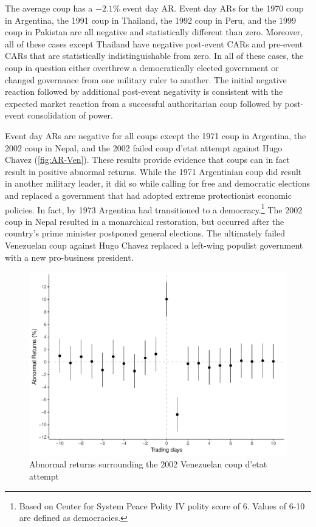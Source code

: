 \documentclass[12pt,final,fleqn]{article}
\theoremstyle{plain}
\begin{document}
The average coup has a $-2.1\%$ event day AR. Event day ARs for the 1970 coup in Argentina, the 1991 coup in Thailand, the 1992 coup in Peru, and the 1999 coup in Pakistan are all negative and statistically different than zero. Moreover, all of these cases except Thailand have negative post-event CARs and pre-event CARs that are statistically indistinguishable from zero. In all of these cases, the coup in question either overthrew a democratically elected government or changed governance from one military ruler to another. The initial negative reaction followed by additional post-event negativity is consistent with the expected market reaction from a successful authoritarian coup followed by post-event consolidation of power. 

Event day ARs are negative for all coups except the 1971 coup in Argentina, the 2002 coup in Nepal, and the 2002 failed coup d'etat attempt against Hugo Chavez (\autoref{fig:AR-Ven}). These results provide evidence that coups can in fact result in positive abnormal returns. While the 1971 Argentinian coup did result in another military leader, it did so while calling for free and democratic elections and replaced a government that had adopted extreme protectionist economic policies. In fact, by 1973 Argentina had transitioned to a democracy.\footnote{Based on Center for System Peace Polity IV polity score of 6. Values of 6-10 are defined as democracies.} The 2002 coup in Nepal resulted in a monarchical restoration, but occurred after the country's prime minister postponed general elections. The ultimately failed Venezuelan coup against Hugo Chavez replaced a left-wing populist government with a new pro-business president.

\begin{figure}[!ht]
\includegraphics{../figs/venezuela_coup_attempt_2002.pdf}
\caption{Abnormal returns surrounding the 2002 Venezuelan coup d'etat attempt}
\label{fig:AR-Ven}
\end{figure}
\end{document}
